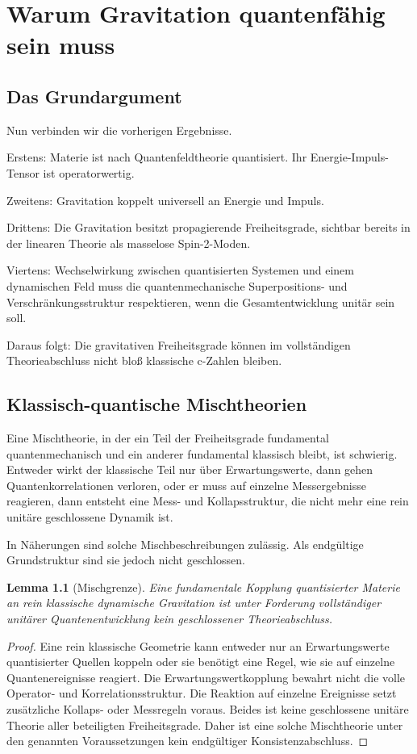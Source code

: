 \documentclass[11pt,a4paper]{book}
\newtheorem{lemma}{Lemma}[chapter]
\theoremstyle{remark}
\begin{document}
\chapter{Warum Gravitation quantenfähig sein muss}
\section{Das Grundargument}
Nun verbinden wir die vorherigen Ergebnisse.

Erstens: Materie ist nach Quantenfeldtheorie quantisiert. Ihr Energie-Impuls-Tensor ist operatorwertig.

Zweitens: Gravitation koppelt universell an Energie und Impuls.

Drittens: Die Gravitation besitzt propagierende Freiheitsgrade, sichtbar bereits in der linearen Theorie als masselose Spin-2-Moden.

Viertens: Wechselwirkung zwischen quantisierten Systemen und einem dynamischen Feld muss die quantenmechanische Superpositions- und Verschränkungsstruktur respektieren, wenn die Gesamtentwicklung unitär sein soll.

Daraus folgt: Die gravitativen Freiheitsgrade können im vollständigen Theorieabschluss nicht bloß klassische c-Zahlen bleiben.

\section{Klassisch-quantische Mischtheorien}
Eine Mischtheorie, in der ein Teil der Freiheitsgrade fundamental quantenmechanisch und ein anderer fundamental klassisch bleibt, ist schwierig. Entweder wirkt der klassische Teil nur über Erwartungswerte, dann gehen Quantenkorrelationen verloren, oder er muss auf einzelne Messergebnisse reagieren, dann entsteht eine Mess- und Kollapsstruktur, die nicht mehr eine rein unitäre geschlossene Dynamik ist.

In Näherungen sind solche Mischbeschreibungen zulässig. Als endgültige Grundstruktur sind sie jedoch nicht geschlossen.

\begin{lemma}[Mischgrenze]
Eine fundamentale Kopplung quantisierter Materie an rein klassische dynamische Gravitation ist unter Forderung vollständiger unitärer Quantenentwicklung kein geschlossener Theorieabschluss.
\end{lemma}

\begin{proof}
Eine rein klassische Geometrie kann entweder nur an Erwartungswerte quantisierter Quellen koppeln oder sie benötigt eine Regel, wie sie auf einzelne Quantenereignisse reagiert. Die Erwartungswertkopplung bewahrt nicht die volle Operator- und Korrelationsstruktur. Die Reaktion auf einzelne Ereignisse setzt zusätzliche Kollaps- oder Messregeln voraus. Beides ist keine geschlossene unitäre Theorie aller beteiligten Freiheitsgrade. Daher ist eine solche Mischtheorie unter den genannten Voraussetzungen kein endgültiger Konsistenzabschluss.
\end{proof}
\end{document}
